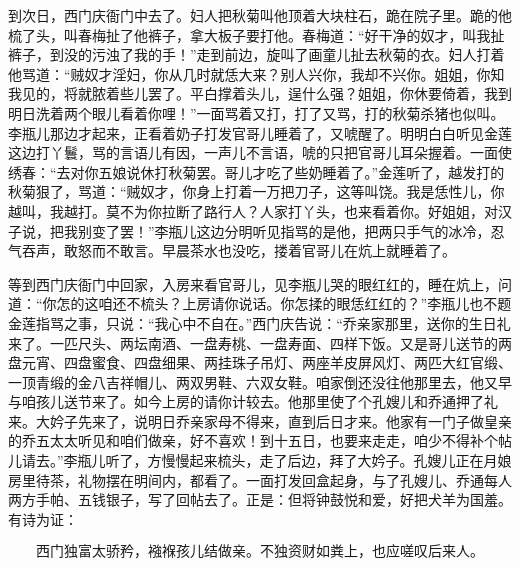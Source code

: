 到次日，西门庆衙门中去了。妇人把秋菊叫他顶着大块柱石，跪在院子里。跪的他梳了头，叫春梅扯了他裤子，拿大板子要打他。春梅道：“好干净的奴才，叫我扯裤子，到没的污浊了我的手！”走到前边，旋叫了画童儿扯去秋菊的衣。妇人打着他骂道：“贼奴才淫妇，你从几时就恁大来？别人兴你，我却不兴你。姐姐，你知我见的，将就脓着些儿罢了。平白撑着头儿，逞什么强？姐姐，你休要倚着，我到明日洗着两个眼儿看着你哩！”一面骂着又打，打了又骂，打的秋菊杀猪也似叫。李瓶儿那边才起来，正看着奶子打发官哥儿睡着了，又唬醒了。明明白白听见金莲这边打丫鬟，骂的言语儿有因，一声儿不言语，唬的只把官哥儿耳朵握着。一面使绣春：“去对你五娘说休打秋菊罢。哥儿才吃了些奶睡着了。”金莲听了，越发打的秋菊狠了，骂道：“贼奴才，你身上打着一万把刀子，这等叫饶。我是恁性儿，你越叫，我越打。莫不为你拉断了路行人？人家打丫头，也来看着你。好姐姐，对汉子说，把我别变了罢！”李瓶儿这边分明听见指骂的是他，把两只手气的冰冷，忍气吞声，敢怒而不敢言。早晨茶水也没吃，搂着官哥儿在炕上就睡着了。

等到西门庆衙门中回家，入房来看官哥儿，见李瓶儿哭的眼红红的，睡在炕上，问道：“你怎的这咱还不梳头？上房请你说话。你怎揉的眼恁红红的？”李瓶儿也不题金莲指骂之事，只说：“我心中不自在。”西门庆告说：“乔亲家那里，送你的生日礼来了。一匹尺头、两坛南酒、一盘寿桃、一盘寿面、四样下饭。又是哥儿送节的两盘元宵、四盘蜜食、四盘细果、两挂珠子吊灯、两座羊皮屏风灯、两匹大红官缎、一顶青缎的金八吉祥帽儿、两双男鞋、六双女鞋。咱家倒还没往他那里去，他又早与咱孩儿送节来了。如今上房的请你计较去。他那里使了个孔嫂儿和乔通押了礼来。大妗子先来了，说明日乔亲家母不得来，直到后日才来。他家有一门子做皇亲的乔五太太听见和咱们做亲，好不喜欢！到十五日，也要来走走，咱少不得补个帖儿请去。”李瓶儿听了，方慢慢起来梳头，走了后边，拜了大妗子。孔嫂儿正在月娘房里待茶，礼物摆在明间内，都看了。一面打发回盒起身，与了孔嫂儿、乔通每人两方手帕、五钱银子，写了回帖去了。正是：但将钟鼓悦和爱，好把犬羊为国羞。有诗为证：

\[
西门独富太骄矜，襁褓孩儿结做亲。
不独资财如粪上，也应嗟叹后来人。
\]
